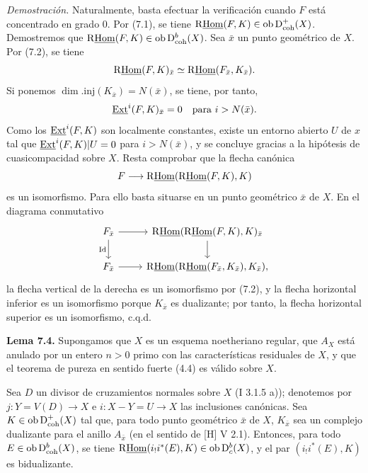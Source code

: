 \emph{Demostración.} Naturalmente, basta efectuar la verificación cuando $F$ está concentrado en grado $0$. Por (7.1), se tiene $\mathrm{R}\underline{\operatorname{Hom}}(F,K)\in\operatorname{ob}\mathrm{D}^{+}_{\mathrm{coh}}(X)$. Demostremos que $\mathrm{R}\underline{\operatorname{Hom}}(F,K)\in\operatorname{ob}\mathrm{D}^{b}_{\mathrm{coh}}(X)$. Sea $\bar{x}$ un punto geométrico de $X$. Por (7.2), se tiene
\[
        \mathrm{R}\underline{\operatorname{Hom}}(F,K)_{\bar{x}}\simeq \mathrm{R}\underline{\operatorname{Hom}}(F_{\bar{x}},K_{\bar{x}}).
\]
Si ponemos $\dim.\mathrm{inj}(K_{\bar{x}})=N(\bar{x})$, se tiene, por tanto,
\[
        \underline{\operatorname{Ext}}^i(F,K)_{\bar{x}}=0\quad\hbox{para }i>N(\bar{x}).
\]
Como los $\underline{\operatorname{Ext}}^{i}(F,K)$ son localmente constantes, existe un entorno abierto $U$ de $x$ tal que $\underline{\operatorname{Ext}}^{i}(F,K)|U=0$ para $i>N(\bar{x})$, y se concluye gracias a la hipótesis de cuasicompacidad sobre $X$. Resta comprobar que la flecha canónica
\[
        F\longrightarrow \mathrm{R}\underline{\operatorname{Hom}}(\mathrm{R}\underline{\operatorname{Hom}}(F,K),K)
\]
es un isomorfismo. Para ello basta situarse en un punto geométrico $\bar{x}$ de $X$. En el diagrama conmutativo
\[
\begin{tikzcd}
F_{\bar{x}} \arrow[r] \arrow[d,"\mathrm{Id}"'] & \R\underline{\Hom}(\R\underline{\Hom}(F,K),K)_{\bar{x}} \arrow[d]\\
F_{\bar{x}} \arrow[r] & \R\underline{\Hom}(\R\underline{\Hom}(F_{\bar{x}},K_{\bar{x}}),K_{\bar{x}}),
\end{tikzcd}
\]
la flecha vertical de la derecha es un isomorfismo por (7.2), y la flecha horizontal inferior es un isomorfismo porque $K_{\bar{x}}$ es dualizante; por tanto, la flecha horizontal superior es un isomorfismo, c.q.d.

\textbf{Lema 7.4.} Supongamos que $X$ es un esquema noetheriano regular, que $A_X$ está anulado por un entero $n>0$ primo con las características residuales de $X$, y que el teorema de pureza en sentido fuerte (4.4) es válido sobre $X$.

Sea $D$ un divisor de cruzamientos normales sobre $X$ (I 3.1.5 a)); denotemos por $j:Y=V(D)\to X$ e $i:X-Y=U\to X$ las inclusiones canónicas. Sea $K\in\operatorname{ob}\mathrm{D}^{+}_{\mathrm{coh}}(X)$ tal que, para todo punto geométrico $\bar{x}$ de $X$, $K_{\bar{x}}$ sea un complejo dualizante para el anillo $A_{\bar{x}}$ (en el sentido de [H] V 2.1). Entonces, para todo $E\in\operatorname{ob}\mathrm{D}^{b}_{\mathrm{coh}}(X)$, se tiene $\mathrm{R}\underline{\operatorname{Hom}}(i_!i^*(E),K)\in\operatorname{ob}\mathrm{D}^{b}_{c}(X)$, y el par $(i_!i^*(E),K)$ es bidualizante.

